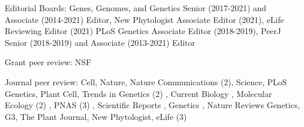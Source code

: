 \documentclass[letterpaper,10pt]{article}
\newcommand{\ignore}[1]{}
\renewenvironment{itemize}{
  \begin{list}{}{
    \setlength{\leftmargin}{1.5em}
  }
}{
  \end{list}
}
\begin{document}
\begin{itemize}
\item Editorial Boards:
Genes, Genomes, and Genetics Senior (2017-2021) and Associate (2014-2021) Editor, %
New Phytologist Associate Editor (2021),  %
eLife Reviewing Editor (2021)
PLoS Genetics Associate Editor (2018-2019),
PeerJ Senior (2018-2019) and Associate (2013-2021) Editor
\item Grant peer review: NSF \ignore{1/21}
\item Journal peer review:  \ignore{2/20} Cell, \ignore{1/21} Nature, \ignore{7/20,7/19} Nature Communications (2),   \ignore{7/19} Science, \ignore{8/19} PLoS Genetics,   \ignore{4/20} Plant Cell,  Trends in Genetics (2) \ignore{9/21, 6/21}, Current Biology \ignore{3/21}, Molecular Ecology (2) \ignore{3/21,7/19}, PNAS (3) \ignore{7/21,7/18,8/18}, Scientific Reports \ignore{3/2021}, Genetics \ignore{1/21}, \ignore{2/19} Nature Reviews Genetics, G3, \ignore{1/21} The Plant Journal, \ignore{7/19} New Phytologist, \ignore{10/18,1/19,11/19} eLife (3)

\end{itemize}
\end{document}

